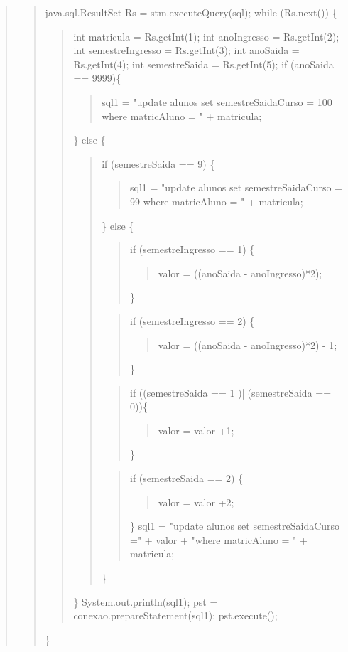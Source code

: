 \begin{quote}
\begin{quote}
		java.sql.ResultSet Rs = stm.executeQuery(sql); \newline
		while (Rs.next()) \{
			\begin{quote}
				int matricula = Rs.getInt(1); \newline
				int anoIngresso = Rs.getInt(2); \newline
				int semestreIngresso =  Rs.getInt(3); \newline
				int anoSaida = Rs.getInt(4); \newline
				int semestreSaida = Rs.getInt(5); \newline
				if (anoSaida == 9999)\{
				\begin{quote}
					sql1 = "update alunos set semestreSaidaCurso = 100 where matricAluno = " + matricula;
				\end{quote}
				\} else \{
				\begin{quote}
					if (semestreSaida == 9) \{
					\begin{quote}
						sql1 = "update alunos set semestreSaidaCurso = 99 where matricAluno = " + matricula;
					\end{quote}
					\} else \{
					\begin{quote}
						if (semestreIngresso == 1) \{
						\begin{quote}
							valor = ((anoSaida - anoIngresso)*2);
						\end{quote}
						\} 
					\end{quote}
					\begin{quote}
						if (semestreIngresso == 2) \{
						\begin{quote}
							valor = ((anoSaida - anoIngresso)*2) - 1;
						\end{quote}
						\}
					\end{quote}
					\begin{quote}
						if ((semestreSaida == 1 )||(semestreSaida == 0))\{
						\begin{quote}
						valor = valor +1;
						\end{quote}
						\} 
					\end{quote}
					\begin{quote}
						if (semestreSaida == 2) \{
						\begin{quote}
							valor = valor +2;
						\end{quote}
						\} \newline
						sql1 = "update alunos set semestreSaidaCurso =" + valor + "where matricAluno = " + matricula;
					\end{quote}
					\}
				\end{quote}
				\} \newline
				System.out.println(sql1); \newline
				pst = conexao.prepareStatement(sql1); \newline
				pst.execute(); 
			\end{quote}
			\}
			

\end{quote}
\end{quote}
